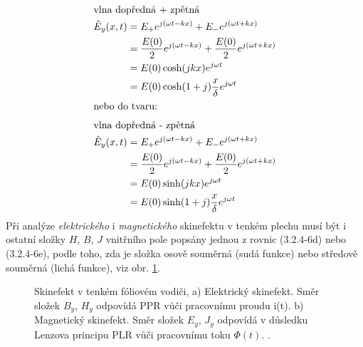         \begin{subequations}
          \begin{align}
            \shortintertext{vlna dopředná + zpětná}
            \hat{E}_y(x,t) 
              &= E_+e^{j(\omega t - kx)} + E_-e^{j(\omega t + kx)}           \nonumber \\
              &= \frac{E(0)}{2}e^{j(\omega t - kx)} +  
                 \frac{E(0)}{2}e^{j(\omega t + kx)}                          \nonumber \\
              &= E(0)\cosh(jkx)e^{j\omega t}                                 \nonumber \\
              &= E(0)\cosh(1+j)\frac{x}{\delta}e^{j\omega t}   \label{ES:eq_elmagp50a} \\
            \shortintertext{nebo do tvaru:}
            \shortintertext{vlna dopředná - zpětná}
            \hat{E}_y(x,t) 
              &= E_+e^{j(\omega t - kx)} + E_-e^{j(\omega t + kx)}           \nonumber \\
              &= \frac{E(0)}{2}e^{j(\omega t - kx)} + 
                 \frac{E(0)}{2}e^{j(\omega t + kx)}                          \nonumber \\
              &= E(0)\sinh(jkx)e^{j\omega t}                                 \nonumber \\
              &= E(0)\sinh(1+j)\frac{x}{\delta}e^{j\omega t}  \label{ES:eq_elmagp50b}   
          \end{align}
        \end{subequations}
        Při analýze \emph{elektrického} i \emph{magnetického} skinefektu v tenkém plechu musí být i 
        ostatní složky \(H\), \(B\), \(J\) vnitřního pole popsány jednou z rovnic (3.2.4-6d) nebo 
        (3.2.4-6e), podle toho, zda je složka osově souměrná (sudá funkce) nebo středově souměrná 
        (lichá funkce), viz  obr. \ref{ES:fig_elmgp04}.
        \begin{figure}[ht!]
          \centering  
          \caption{Skinefekt v tenkém fóliovém vodiči, a) Elektrický skinefekt. Směr složek 
            \(B_y\), \(H_y\) odpovídá  PPR vůči pracovnímu proudu i(t). b) Magnetický 
            skinefekt. Směr složek \(E_y\), \(J_y\)  odpovídá v důsledku Lenzova principu 
            PLR vůči pracovnímu toku \(\Phi(t)\). \cite[s.~79]{Patocka4}.}
          \label{ES:fig_elmgp04}
        \end{figure}
        
